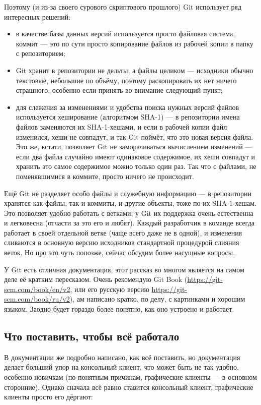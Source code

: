 \documentclass{../text-style}
\begin{document}
Поэтому (и из-за своего сурового скриптового прошлого) Git использует ряд интересных решений:

\begin{itemize}
    \item в качестве базы данных версий используется просто файловая система, коммит --- это по сути просто копирование файлов из рабочей копии в папку с репозиторием;
    \item Git хранит в репозитории не дельты, а файлы целиком --- исходники обычно текстовые, небольшие по объёму, поэтому раскопировать их нет ничего страшного, особенно если принять во внимание следующий пункт;
    \item для слежения за изменениями и удобства поиска нужных версий файлов используется хеширование (алгоритмом SHA-1) --- в репозитории имена файлов заменяются их SHA-1-хешами, и если в рабочей копии файл изменился, хеши не совпадут, и так Git поймёт, что это новая версия файла. Это же, кстати, позволяет Git не заморачиваться вычислением изменений --- если два файла случайно имеют одинаковое содержимое, их хеши совпадут и хранить это самое содержимое можно только один раз. Так что с файлами, не поменявшимися в коммите, просто ничего не происходит.
\end{itemize}

Ещё Git не разделяет особо файлы и служебную информацию --- в репозитории хранятся как файлы, так и коммиты, и другие объекты, тоже по их SHA-1-хешам. Это позволяет удобно работать с ветками, у Git их поддержка очень естественна и легковесна (отчасти за это его и любят). Каждый разработчик в команде всегда работает в своей отдельной ветке (чаще всего даже не в одной), и изменения сливаются в основную версию исходников стандартной процедурой слияния веток. Но про это чуть попозже, сейчас обсудим более насущные вопросы.

У Git есть отличная документация, этот рассказ во многом является на самом деле её кратким пересказом. Очень рекомендую Git Book (\url{https://git-scm.com/book/en/v2}, или его русскую версию \url{https://git-scm.com/book/ru/v2}), ам написано кратко, по делу, с картинками и хорошим языком. Заодно будет гораздо более понятно, как оно устроено и работает.

\subsection{Что поставить, чтобы всё работало}

В документации же подробно написано, как всё поставить, но документация делает больший упор на консольный клиент, что может быть не так удобно, особенно новичкам (по понятным причинам, графические клиенты --- в основном сторонние). Однако сначала всё равно ставится консольный клиент, графические клиенты просто его дёргают:
\end{document}
